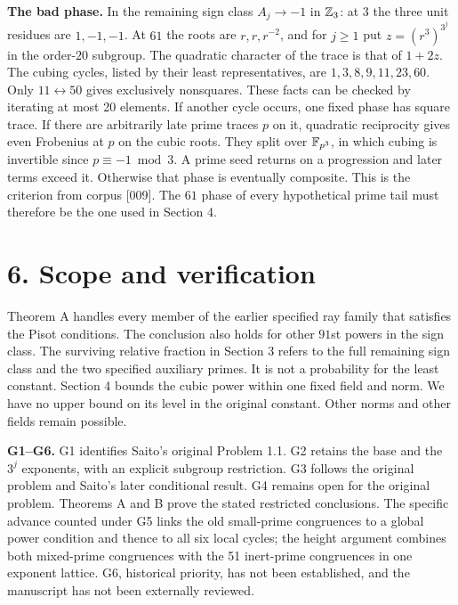 \documentclass[11pt,a4paper,oneside,openany]{book}
\newcommand{\localhead}[1]{\needspace{5\baselineskip}\section*{\color{ink}#1}}
\let\sect\localhead\let\secx\localhead\let\head\localhead
\begin{document}
\textbf{The bad phase.} In the remaining sign class $A_j\to-1$ in $\mathbb Z_3$: at $3$ the three unit residues are $1,-1,-1$. At $61$ the roots are $r,r,r^{-2}$, and for $j\ge1$ put $z=(r^3)^{3^j}$ in the order-$20$ subgroup. The quadratic character of the trace is that of $1+2z$. The cubing cycles, listed by their least representatives, are $1,3,8,9,11,23,60$. Only $11\leftrightarrow50$ gives exclusively nonsquares. These facts can be checked by iterating at most 20 elements. If another cycle occurs, one fixed phase has square trace. If there are arbitrarily late prime traces $p$ on it, quadratic reciprocity gives even Frobenius at $p$ on the cubic roots. They split over $\mathbb F_{p^3}$, in which cubing is invertible since $p\equiv-1\bmod3$. A prime seed returns on a progression and later terms exceed it. Otherwise that phase is eventually composite. This is the criterion from corpus [009]. The $61$ phase of every hypothetical prime tail must therefore be the one used in Section 4.




\sect{6. Scope and verification}
Theorem A handles every member of the earlier specified ray family that satisfies the Pisot conditions. The conclusion also holds for other $91$st powers in the sign class. The surviving relative fraction in Section 3 refers to the full remaining sign class and the two specified auxiliary primes. It is not a probability for the least constant. Section 4 bounds the cubic power within one fixed field and norm. We have no upper bound on its level in the original constant. Other norms and other fields remain possible.

\textbf{G1--G6.} G1 identifies Saito's original Problem 1.1. G2 retains the base and the $3^j$ exponents, with an explicit subgroup restriction. G3 follows the original problem and Saito's later conditional result. G4 remains open for the original problem. Theorems A and B prove the stated restricted conclusions. The specific advance counted under G5 links the old small-prime congruences to a global power condition and thence to all six local cycles; the height argument combines both mixed-prime congruences with the 51 inert-prime congruences in one exponent lattice. G6, historical priority, has not been established, and the manuscript has not been externally reviewed.
\end{document}
